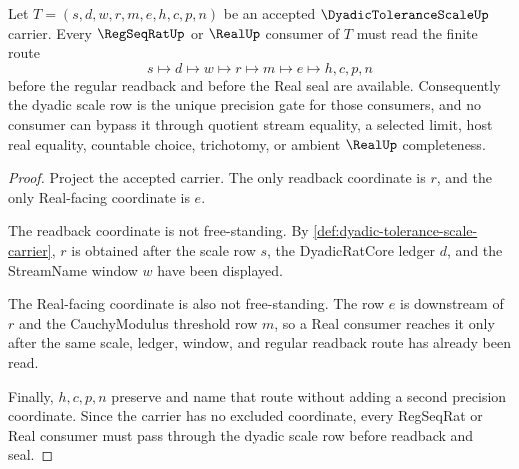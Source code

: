 \begin{theorem}
\label{thm:dyadic-tolerance-scale-regseqrat-handoff}
Let $T=(s,d,w,r,m,e,h,c,p,n)$ be an accepted $\DyadicToleranceScaleUp$ carrier. Every $\RegSeqRatUp$ or $\RealUp$ consumer of $T$ must read the finite route
$$
s \longmapsto d \longmapsto w \longmapsto r \longmapsto m \longmapsto e \longmapsto h,c,p,n
$$
before the regular readback and before the Real seal are available. Consequently the dyadic scale row is the unique precision gate for those consumers, and no consumer can bypass it through quotient stream equality, a selected limit, host real equality, countable choice, trichotomy, or ambient $\RealUp$ completeness.
\end{theorem}
\begin{proof}
Project the accepted carrier. The only readback coordinate is $r$, and the only Real-facing coordinate is $e$.

The readback coordinate is not free-standing. By \autoref{def:dyadic-tolerance-scale-carrier}, $r$ is obtained after the scale row $s$, the DyadicRatCore ledger $d$, and the StreamName window $w$ have been displayed.

The Real-facing coordinate is also not free-standing. The row $e$ is downstream of $r$ and the CauchyModulus threshold row $m$, so a Real consumer reaches it only after the same scale, ledger, window, and regular readback route has already been read.

Finally, $h,c,p,n$ preserve and name that route without adding a second precision coordinate. Since the carrier has no excluded coordinate, every RegSeqRat or Real consumer must pass through the dyadic scale row before readback and seal.
\end{proof}

